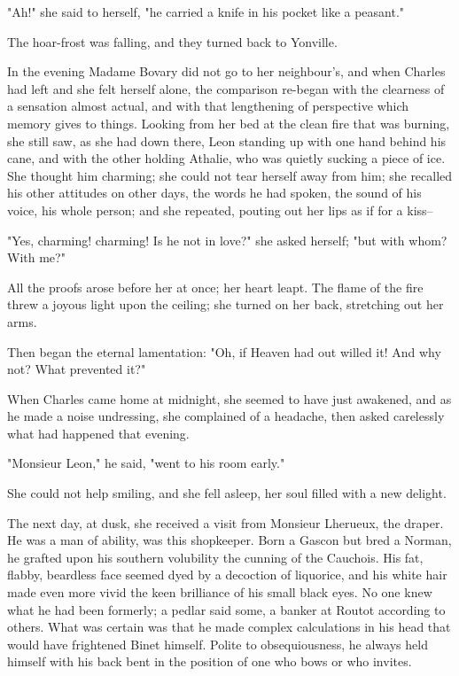 \documentclass{tufte-book}
\begin{document}
"Ah!" she said to herself, "he carried a knife in his pocket like a
peasant."

The hoar-frost was falling, and they turned back to Yonville.

In the evening Madame Bovary did not go to her neighbour's, and when
Charles had left and she felt herself alone, the comparison re-began
with the clearness of a sensation almost actual, and with that
lengthening of perspective which memory gives to things. Looking from
her bed at the clean fire that was burning, she still saw, as she had
down there, Leon standing up with one hand behind his cane, and with
the other holding Athalie, who was quietly sucking a piece of ice. She
thought him charming; she could not tear herself away from him; she
recalled his other attitudes on other days, the words he had spoken, the
sound of his voice, his whole person; and she repeated, pouting out her
lips as if for a kiss--

"Yes, charming! charming! Is he not in love?" she asked herself; "but
with whom? With me?"

All the proofs arose before her at once; her heart leapt. The flame of
the fire threw a joyous light upon the ceiling; she turned on her back,
stretching out her arms.

Then began the eternal lamentation: "Oh, if Heaven had out willed it!
And why not? What prevented it?"

When Charles came home at midnight, she seemed to have just awakened,
and as he made a noise undressing, she complained of a headache, then
asked carelessly what had happened that evening.

"Monsieur Leon," he said, "went to his room early."

She could not help smiling, and she fell asleep, her soul filled with a
new delight.

The next day, at dusk, she received a visit from Monsieur Lherueux, the
draper. He was a man of ability, was this shopkeeper. Born a Gascon but
bred a Norman, he grafted upon his southern volubility the cunning of
the Cauchois. His fat, flabby, beardless face seemed dyed by a
decoction of liquorice, and his white hair made even more vivid the
keen brilliance of his small black eyes. No one knew what he had been
formerly; a pedlar said some, a banker at Routot according to others.
What was certain was that he made complex calculations in his head that
would have frightened Binet himself. Polite to obsequiousness, he always
held himself with his back bent in the position of one who bows or who
invites.
\end{document}
